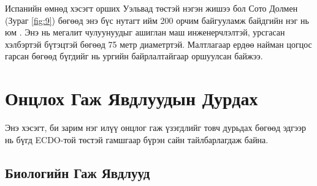 \documentclass[10pt,twocolumn,letterpaper]{article}
\begin{document}
Испанийн өмнөд хэсэгт орших Уэльвад төстэй нэгэн жишээ бол Сото Долмен (Зураг \ref{fig:9}) бөгөөд энэ бүс нутагт ийм 200 орчим байгууламж байдгийн нэг нь юм \cite{72,32}. Энэ нь мегалит чулуунуудыг ашиглан маш инженерчлэлтэй, урсгасан хэлбэртэй бүтэцтэй бөгөөд 75 метр диаметртэй. Малтлагаар ердөө найман цогцос гарсан бөгөөд бүгдийг нь ургийн байрлалтайгаар оршуулсан байжээ.

\section{Онцлох Гаж Явдлуудын Дурдах}

Энэ хэсэгт, би зарим нэг илүү онцлог гаж үзэгдлийг товч дурьдах бөгөөд эдгээр нь бүгд ECDO-той төстэй гамшгаар бүрэн сайн тайлбарлагдаж байна.

\subsection{Биологийн Гаж Явдлууд}
\end{document}

